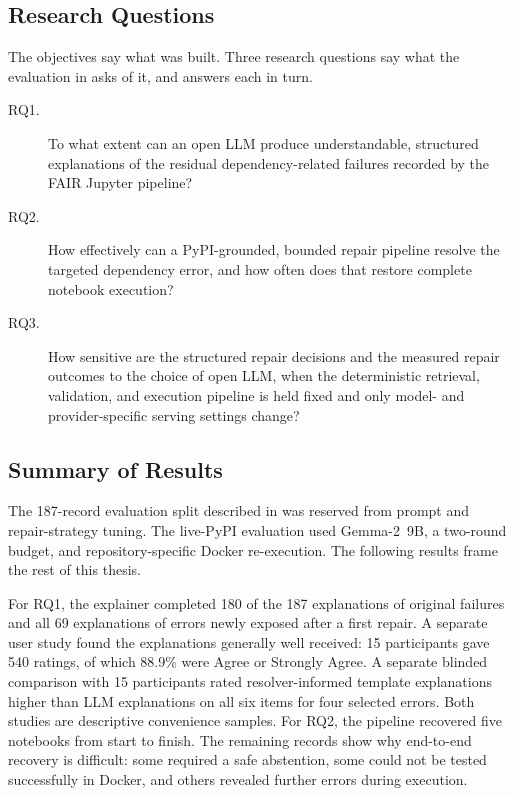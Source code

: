 \subsection{Research Questions}
\label{sec:intro-rqs}

The objectives say what was built. Three research questions say what the
evaluation in  asks of it, and 
answers each in turn.

\begin{description}
  \item[RQ1.] To what extent can an open LLM produce understandable,
    structured explanations of the residual dependency-related failures
    recorded by the FAIR Jupyter pipeline?

  \item[RQ2.] How effectively can a PyPI-grounded, bounded repair pipeline
    resolve the targeted dependency error, and how often does that restore
    complete notebook execution?

  \item[RQ3.] How sensitive are the structured repair decisions and the
    measured repair outcomes to the choice of open LLM, when the deterministic
    retrieval, validation, and execution pipeline is held fixed and only
    model- and provider-specific serving settings change?
\end{description}

\subsection{Summary of Results}
\label{sec:intro-status}

The 187-record evaluation split described in 
was reserved from prompt and repair-strategy tuning. The live-PyPI evaluation
used Gemma-2~9B, a two-round budget, and repository-specific Docker
re-execution. The following results frame the rest of this thesis.

For RQ1, the explainer completed 180 of the 187 explanations of original
failures and all 69 explanations of errors newly exposed after a first repair.
A separate user study found the explanations generally well received: 15
participants gave 540 ratings, of which 88.9\% were Agree or Strongly Agree.
A separate blinded comparison with 15 participants rated resolver-informed
template explanations higher than LLM explanations on all six items for four
selected errors. Both studies are descriptive convenience samples.
For RQ2, the pipeline recovered five notebooks from start to finish. The
remaining records show why end-to-end recovery is difficult: some required a
safe abstention, some could not be tested successfully in Docker, and others
revealed further errors during execution.

